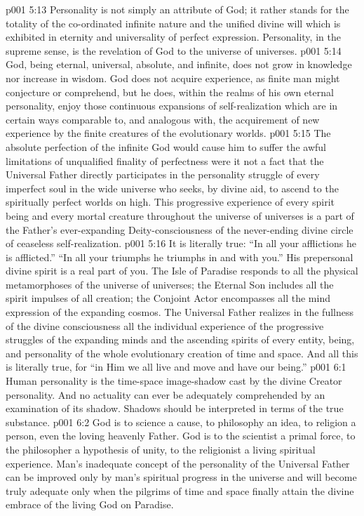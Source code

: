 \pc \vs p001 5:13 Personality is not simply an attribute of God; it rather stands for the totality of the co\hyp{}ordinated infinite nature and the unified divine will which is exhibited in eternity and universality of perfect expression. Personality, in the supreme sense, is the revelation of God to the universe of universes.
\pc \vs p001 5:14 God, being eternal, universal, absolute, and infinite, does not grow in knowledge nor increase in wisdom. God does not acquire experience, as finite man might conjecture or comprehend, but he does, within the realms of his own eternal personality, enjoy those continuous expansions of self\hyp{}realization which are in certain ways comparable to, and analogous with, the acquirement of new experience by the finite creatures of the evolutionary worlds.
\vs p001 5:15 The absolute perfection of the infinite God would cause him to suffer the awful limitations of unqualified finality of perfectness were it not a fact that the Universal Father directly participates in the personality struggle of every imperfect soul in the wide universe who seeks, by divine aid, to ascend to the spiritually perfect worlds on high. This progressive experience of every spirit being and every mortal creature throughout the universe of universes is a part of the Father’s ever\hyp{}expanding Deity\hyp{}consciousness of the never\hyp{}ending divine circle of ceaseless self\hyp{}realization.\plusone
\vs p001 5:16 It is literally true: “In all your afflictions he is afflicted.” “In all your triumphs he triumphs in and with you.” His prepersonal divine spirit is a real part of you. The Isle of Paradise responds to all the physical metamorphoses of the universe of universes; the Eternal Son includes all the spirit impulses of all creation; the Conjoint Actor encompasses all the mind expression of the expanding cosmos. The Universal Father realizes in the fullness of the divine consciousness all the individual experience of the progressive struggles of the expanding minds and the ascending spirits of every entity, being, and personality of the whole evolutionary creation of time and space. And all this is literally true, for “in Him we all live and move and have our being.”
\vs p001 6:1 Human personality is the time\hyp{}space image\hyp{}shadow cast by the divine Creator personality. And no actuality can ever be adequately comprehended by an examination of its shadow. Shadows should be interpreted in terms of the true substance.
\pc \vs p001 6:2 God is to science a cause, to philosophy an idea, to religion a person, even the loving heavenly Father. God is to the scientist a primal force, to the philosopher a hypothesis of unity, to the religionist a living spiritual experience. Man’s inadequate concept of the personality of the Universal Father can be improved only by man’s spiritual progress in the universe and will become truly adequate only when the pilgrims of time and space finally attain the divine embrace of the living God on Paradise.
